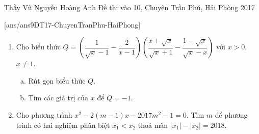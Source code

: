\begin{name}
{Thầy  Vũ Nguyễn Hoàng Anh}
{Đề thi vào 10, Chuyên Trần Phú, Hải Phòng 2017}
\end{name}
\setcounter{ex}{0}
[ans/ans9DT17-ChuyenTranPhu-HaiPhong]

\begin{ex}%
\begin{enumerate}[1)]
\item Cho biểu thức $Q=\left(\dfrac{1}{\sqrt{x}-1}-\dfrac{2}{x-1}\right)\left(\dfrac{x+\sqrt{x}}{\sqrt{x}+1}-\dfrac{1-\sqrt{x}}{\sqrt{x}-x}\right)$ với $x>0$, $x\ne 1$.
	\begin{enumerate}[a)]
	\item Rút gọn biểu thức $Q$.
	\item Tìm các giá trị của $x$ để $Q=-1$.
	\end{enumerate}
\item Cho phương trình $x^2-2(m-1)x-2017m^2-1=0$. Tìm $m$ để phương trình có hai nghiệm phân biệt $x_1<x_2$ thoả mãn $|x_1|-|x_2|=2018$.
\end{enumerate}
\end{ex}

